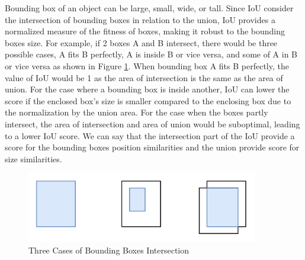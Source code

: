   Bounding box of an object can be large, small, wide, or tall.
  Since IoU consider the intersection of bounding boxes in relation to the union,
  IoU provides a normalized measure of the fitness of boxes, making it robust 
  to the bounding boxes size. For example, if 2 boxes A and B intersect, there would be
  three possible cases, A fits B perfectly, A is inside B or vice versa, and some of A in B or vice versa as shown in Figure \ref{fig:intersections-iou}.
  When bounding box A fits B perfectly, the value of IoU would be 1 as the area of intersection is the same as the area of union.
  For the case where a bounding box is inside another, IoU can lower the score if the enclosed box's size is smaller compared to
  the enclosing box due to the normalization by the union area.
  For the case when the boxes partly intersect, the area of intersection and area of union would be suboptimal, leading to a lower IoU score. 
  We can say that the intersection part of the IoU provide a score for the bounding boxes position similarities and the 
  union provide score for size similarities.

    \begin{figure}[p]
        \centering
        \includegraphics[width=0.9\textwidth]{figures/iou-intersect.png}
        \caption{Three Cases of Bounding Boxes Intersection}
        \label{fig:intersections-iou}
    \end{figure}
  
